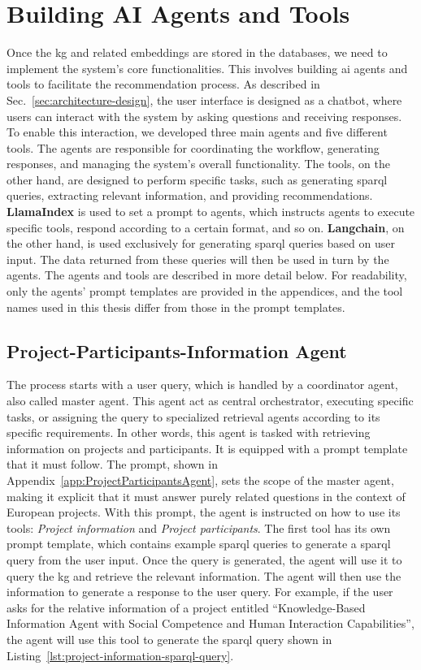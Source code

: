 \section{Building AI Agents and Tools}\label{sec:building-ai-agents}
Once the \gls{kg} and related embeddings are stored in the databases, we need to implement the system's core functionalities.
This involves building \gls{ai} agents and tools to facilitate the recommendation process.
As described in Sec.~\ref{sec:architecture-design}, the user interface is designed as a chatbot, where users can interact with the system by asking questions and receiving responses.
To enable this interaction, we developed three main agents and five different tools.
The agents are responsible for coordinating the workflow, generating responses, and managing the system's overall functionality.
The tools, on the other hand, are designed to perform specific tasks, such as generating \gls{sparql} queries, extracting relevant information, and providing recommendations.
\textbf{LlamaIndex} is used to set a prompt to agents, which instructs agents to execute specific tools, respond according to a certain format, and so on.
\textbf{Langchain}, on the other hand, is used exclusively for generating \gls{sparql} queries based on user input.
The data returned from these queries will then be used in turn by the agents.
The agents and tools are described in more detail below.
For readability, only the agents' prompt templates are provided in the appendices, and the tool names used in this thesis differ from those in the prompt templates.

\subsection*{Project-Participants-Information Agent}
The process starts with a user query, which is handled by a coordinator agent, also called master agent.
This agent act as central orchestrator, executing specific tasks, or assigning the query to specialized retrieval agents according to its specific requirements.
In other words, this agent is tasked with retrieving information on projects and participants.
It is equipped with a prompt template that it must follow.
The prompt, shown in Appendix~\ref{app:ProjectParticipantsAgent}, sets the scope of the master agent, making it explicit that it must answer purely related questions in the context of European projects.
With this prompt, the agent is instructed on how to use its tools: \textit{Project information} and \textit{Project participants}.
The first tool has its own prompt template, which contains example \gls{sparql} queries to generate a \gls{sparql} query from the user input.
Once the query is generated, the agent will use it to query the \gls{kg} and retrieve the relevant information.
The agent will then use the information to generate a response to the user query.
For example, if the user asks for the relative information of a project entitled ``Knowledge-Based Information Agent with Social Competence and Human Interaction Capabilities'', the agent will use this tool to generate the \gls{sparql} query shown in Listing~\ref{lst:project-information-sparql-query}.

